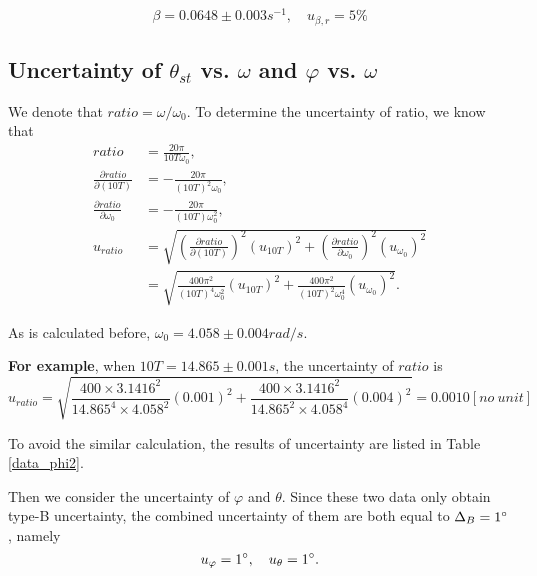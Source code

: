 \[
\beta=0.0648\pm 0.003s^{-1}, \quad u_{\beta,r}=5\%
\]



\subsection{Uncertainty of $\theta_{st}$ vs. $\omega$ and $\varphi$ vs. $\omega$}
    We denote that $ratio=\omega/\omega_0$. To determine the uncertainty of ratio, we know that
    \[
    \begin{split}
        ratio&=\frac{20\pi}{10T\omega_0},\\
        \frac{\partial ratio}{\partial (10T)}&=-\frac{20\pi}{(10T)^2\omega_0},\\
        \frac{\partial ratio}{\partial \omega_0}&=-\frac{20\pi}{(10T)\omega_0^2},\\
        u_{ratio}&=\sqrt{(\frac{\partial ratio}{\partial (10T)})^2(u_{10T})^2+(\frac{\partial ratio}{\partial \omega_0})^2(u_{\omega_0})^2}\\
        &=\sqrt{\frac{400\pi^2}{(10T)^4\omega_0^2}(u_{10T})^2+\frac{400\pi^2}{(10T)^2\omega_0^4}(u_{\omega_0})^2}.
    \end{split}
    \]

    As is calculated before, $\omega_0=4.058\pm 0.004rad/s$.

    \textbf{For example}, when $10T=14.865\pm 0.001s$, the uncertainty of $ratio$ is
    \[
        u_{ratio}=\sqrt{\frac{400\times3.1416^2}{14.865^4\times4.058^2}(0.001)^2+\frac{400\times3.1416^2}{14.865^2\times4.058^4}(0.004)^2}=0.0010[no\ unit]
    \]

    To avoid the similar calculation, the results of uncertainty are listed in Table \ref{data_phi2}.

    Then we consider the uncertainty of $\varphi$ and $\theta$. Since these two data only obtain type-B uncertainty, the combined uncertainty of them are both equal to $\Delta_B=1^\circ$, namely
    \[
        u_{\varphi}=1^\circ, \quad u_{\theta}=1^\circ.
    \]